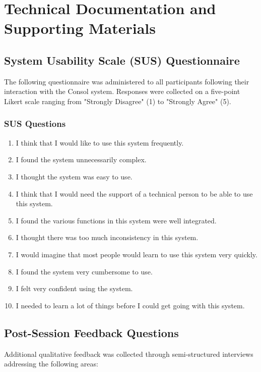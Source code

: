 {\color{maroon}
\chapter{Technical Documentation and Supporting Materials}

\section{System Usability Scale (SUS) Questionnaire}

The following questionnaire was administered to all participants following their interaction with the Consol system. Responses were collected on a five-point Likert scale ranging from "Strongly Disagree" (1) to "Strongly Agree" (5).

\subsection{SUS Questions}
\begin{enumerate}
    \item I think that I would like to use this system frequently.
    \item I found the system unnecessarily complex.
    \item I thought the system was easy to use.
    \item I think that I would need the support of a technical person to be able to use this system.
    \item I found the various functions in this system were well integrated.
    \item I thought there was too much inconsistency in this system.
    \item I would imagine that most people would learn to use this system very quickly.
    \item I found the system very cumbersome to use.
    \item I felt very confident using the system.
    \item I needed to learn a lot of things before I could get going with this system.
\end{enumerate}

\section{Post-Session Feedback Questions}

Additional qualitative feedback was collected through semi-structured interviews addressing the following areas:

}
